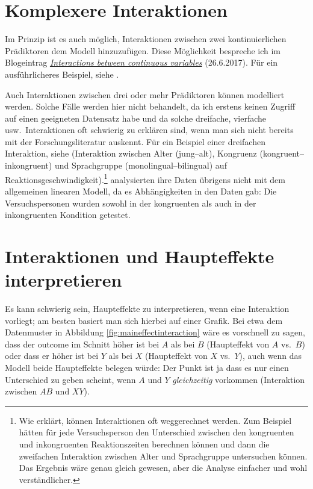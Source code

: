 \documentclass[oneside, 10pt]{book}\usepackage[]{graphicx}\usepackage[]{xcolor}
\begin{document}
\section{Komplexere Interaktionen}
Im Prinzip ist es auch möglich, Interaktionen zwischen zwei
kontinuierlichen Prädiktoren dem Modell hinzuzufügen.
Diese Möglichkeit bespreche ich im Blogeintrag
\href{https://janhove.github.io/analysis/2017/06/26/continuous-interactions}{\textit{Interactions between continuous variables}} (26.6.2017). Für ein ausführlicheres Beispiel,
siehe \citet{Vanhove2017b}.

Auch Interaktionen zwischen drei oder mehr Prädiktoren
können modelliert werden. Solche Fälle werden hier nicht
behandelt, da ich erstens keinen Zugriff auf einen geeigneten
Datensatz habe und da solche dreifache, vierfache usw.\ Interaktionen
oft schwierig zu erklären sind, wenn man sich nicht bereits
mit der Forschungsliteratur auskennt. Für ein Beispiel
einer dreifachen Interaktion, siehe \citet{Bialystok2004}
(Interaktion zwischen Alter (jung--alt), Kongruenz (kongruent--inkongruent) und Sprachgruppe (monolingual--bilingual) auf Reaktionsgeschwindigkeit).\footnote{Wie \citet{Abelson1995} erklärt,
können Interaktionen oft weggerechnet werden. Zum Beispiel hätten \citet{Bialystok2004}
für jede Versuchsperson den Unterschied zwischen den kongruenten und inkongruenten
Reaktionszeiten berechnen können und dann die zweifachen Interaktion zwischen Alter und Sprachgruppe
untersuchen können. Das Ergebnis wäre genau gleich gewesen, aber die Analyse einfacher und wohl verständlicher.}
\citeauthor{Bialystok2004} analysierten ihre Daten übrigens nicht mit dem allgemeinen
linearen Modell, da es Abhängigkeiten in den Daten gab: Die Versuchspersonen wurden
sowohl in der kongruenten als auch in der inkongruenten Kondition getestet.

\section{Interaktionen und Haupteffekte interpretieren}
Es kann schwierig sein, Haupteffekte zu interpretieren, wenn eine Interaktion vorliegt;
am besten basiert man sich hierbei auf einer Grafik. Bei etwa dem
Datenmuster in Abbildung \ref{fig:maineffectinteraction} wäre es vorschnell zu sagen,
dass der outcome im Schnitt höher ist bei
$A$ als bei $B$ (Haupteffekt von $A$ vs.\ $B$) oder dass er höher ist bei $Y$ als bei $X$
(Haupteffekt von $X$ vs.\ $Y$), auch wenn das Modell beide Haupteffekte belegen würde:
Der Punkt ist ja dass es nur einen Unterschied zu geben scheint,
wenn $A$ und $Y$ \emph{gleichzeitig} vorkommen (Interaktion zwischen $AB$ und $XY$).
\end{document}
